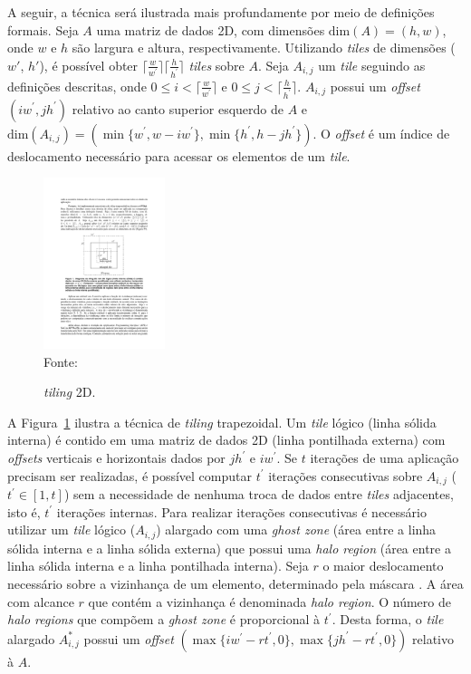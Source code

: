 A seguir, a técnica será ilustrada mais profundamente
por meio de definições formais. Seja $A$ uma matriz de dados 2D, com dimensões
$\textrm{dim}(A) = (h,w)$, onde $w$ e $h$ são largura e altura, respectivamente.
Utilizando \textit{tiles} de dimensões ($w'$, $h'$), é possível obter
$\lceil\frac{w}{w^\prime}\rceil\lceil\frac{h}{h^\prime}\rceil$ \textit{tiles}
sobre $A$. Seja $A_{i,j}$ um \textit{tile} seguindo as definições descritas,
onde $0 \leq i < \lceil\frac{w}{w^\prime}\rceil$ e $0\leq j <
\lceil\frac{h}{h^\prime}\rceil$. $A_{i,j}$ possui um \textit{offset} $(i
w^\prime, j h^\prime)$ relativo ao canto superior esquerdo de $A$ e
$\textrm{dim}(A_{i,j}) = (\min\{w^\prime, w-i w^\prime\}, \min\{h^\prime, h-j
h^\prime\})$. O \textit{offset} é um índice de deslocamento necessário para
acessar os elementos de um \textit{tile}.

\begin{figure}[t]
  \begin{minipage}[b]{0.9\textwidth}
	\centering
    \caption{\textit{tiling} 2D.}
    \includegraphics[height=5cm]{figs/tile.pdf} \\
    Fonte:~\cite{rocha17}
	\label{fig:block2d}
  \end{minipage}
\end{figure}

A Figura~\ref{fig:block2d} ilustra a técnica de \textit{tiling} trapezoidal. Um
\textit{tile} lógico (linha sólida interna) é contido em uma matriz de dados 2D
(linha pontilhada externa) com \textit{offsets} verticais e horizontais dados
por $jh^\prime$ e $iw^\prime$. Se $t$ iterações de uma aplicação \stencil
precisam ser realizadas, é possível computar $t^\prime$ iterações consecutivas
sobre $A_{i,j}$ ($t^\prime \in \left[1,t\right]$) sem a necessidade de nenhuma
troca de dados entre \textit{tiles} adjacentes, isto é, $t^\prime$ iterações
internas. Para realizar iterações consecutivas é necessário utilizar um
\textit{tile} lógico ($A_{i,j}$) alargado com uma \textit{ghost zone} (área
entre a linha sólida interna e a linha sólida externa) que possui uma
\textit{halo region} (área entre a linha sólida interna e a linha pontilhada
interna). Seja $r$ o maior deslocamento necessário sobre a vizinhança de um
elemento, determinado pela máscara \stencil. A área com alcance $r$ que contém a
vizinhança é denominada \textit{halo region}. O número de \textit{halo regions}
que compõem a \textit{ghost zone} é proporcional à $t^\prime$. Desta forma, o
\textit{tile} alargado $A^\ast_{i,j}$ possui um \textit{offset} $(\max\{iw^\prime -
rt^\prime, 0\}, \max\{jh^\prime - rt^\prime, 0\})$ relativo à $A$.

